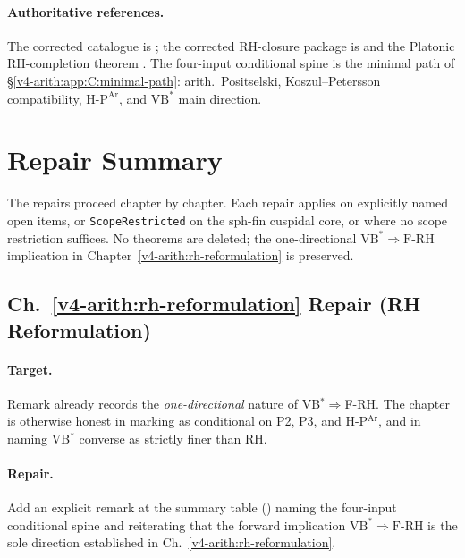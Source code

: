 \paragraph{Authoritative references.} The corrected catalogue is
; the corrected RH-closure
package is  and the Platonic
RH-completion theorem . The
four-input conditional spine is the minimal path of
\S\ref{v4-arith:app:C:minimal-path}: arith.~Positselski,
Koszul--Petersson compatibility,
\(\mathrm{H}\text{-}\mathrm{P}^{\mathrm{Ar}}\), and
\(\mathrm{VB}^{*}\) main direction.

\section{Repair Summary}
\label{v4-arith:w3-audit-B:repair-summary}

The repairs proceed chapter by chapter. Each repair applies
\ClaimStatusProvedHereConditional{} on explicitly named open items,
or \texttt{ScopeRestricted} on the sph-fin cuspidal core, or
\ClaimStatusConjectured{} where no scope restriction suffices. No
theorems are deleted; the one-directional
\(\mathrm{VB}^{*}\Rightarrow\mathrm{F}\text{-}\mathrm{RH}\)
implication in Chapter~\ref{v4-arith:rh-reformulation} is preserved.

\subsection{Ch.~\ref{v4-arith:rh-reformulation} Repair (RH Reformulation)}
\label{v4-arith:w3-audit-B:repair-23}

\paragraph{Target.} Remark
 already records the
\emph{one-directional} nature of VB\(^{*}\Rightarrow\)F-RH. The chapter
is otherwise honest in marking 
as conditional on P2, P3, and H-P\(^{\mathrm{Ar}}\), and in naming
VB\(^{*}\) converse as strictly finer than RH.

\paragraph{Repair.} Add an explicit remark at the summary table
() naming the four-input conditional spine
and reiterating that the forward implication
\(\mathrm{VB}^{*}\Rightarrow\mathrm{F}\text{-}\mathrm{RH}\) is the
sole direction established in Ch.~\ref{v4-arith:rh-reformulation}.

